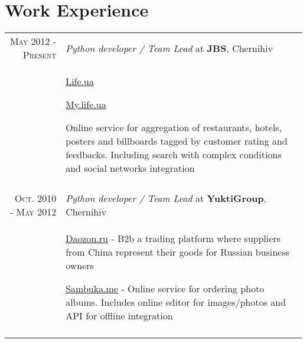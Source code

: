 \documentclass[a4paper,10pt]{article}
\begin{document}
\section{Work Experience}
\begin{tabular}{rp{11cm}}

  \textsc{May 2012 - Present} & \emph{Python developer / Team Lead} at \textbf{JBS}, Chernihiv\\
  & \begin{compactitem}
    \item \href{http://www.life.ua}{Life.ua}
    \item \href{http://www.my.life.ua}{My.life.ua}
    \item Online service for aggregation of restaurants, hotels, posters and billboards tagged by customer rating and feedbacks. Including search with complex conditions and social networks integration
    \end{compactitem}\vspace{-1em} \\
\multicolumn{2}{c}{} \\

  \textsc{Oct. 2010 - May 2012} & \emph{Python developer / Team Lead} at \textbf{YuktiGroup}, Chernihiv\\
  & \begin{compactitem}
    \item \href{http://daozon.ru}{Daozon.ru} - B2b a trading platform where suppliers from China represent their goods for Russian business owners
    \item \href{http://sambuka.me}{Sambuka.me} - Online service for ordering photo albums. Includes online editor for images/photos and API for offline integration 
    \end{compactitem}\vspace{-1em} \\
\multicolumn{2}{c}{} \\



\end{tabular}
\end{document}
